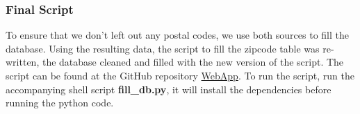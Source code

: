 \subsubsection{Final Script}

To ensure that we don't left out any postal codes, we use both sources to fill
the database.
Using the resulting data, the script to fill the zipcode table was re-written, the database cleaned and filled with the new version of the script. The script can be found at the GitHub repository \href{https://github.com/dataBikeHsUlm/WebApp/blob/master/fill_db_postcodes.py}{WebApp}.
To run the script, run the accompanying shell script \textbf{fill\_db.py}, it will install the dependencies before running the python code.
